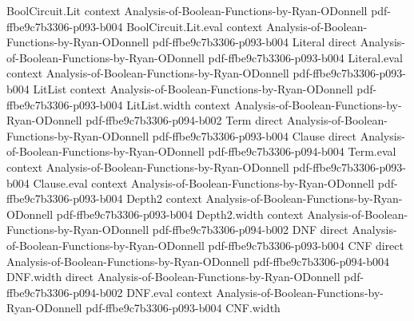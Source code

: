 \begin{theorem}
\leanok
{}
\proofstep
  {BoolCircuit.Lit}
  {context}
  {Analysis-of-Boolean-Functions-by-Ryan-ODonnell}
  {pdf-ffbe9c7b3306-p093-b004}
\proofstep
  {BoolCircuit.Lit.eval}
  {context}
  {Analysis-of-Boolean-Functions-by-Ryan-ODonnell}
  {pdf-ffbe9c7b3306-p093-b004}
\proofstep
  {Literal}
  {direct}
  {Analysis-of-Boolean-Functions-by-Ryan-ODonnell}
  {pdf-ffbe9c7b3306-p093-b004}
\proofstep
  {Literal.eval}
  {context}
  {Analysis-of-Boolean-Functions-by-Ryan-ODonnell}
  {pdf-ffbe9c7b3306-p093-b004}
\proofstep
  {LitList}
  {context}
  {Analysis-of-Boolean-Functions-by-Ryan-ODonnell}
  {pdf-ffbe9c7b3306-p093-b004}
\proofstep
  {LitList.width}
  {context}
  {Analysis-of-Boolean-Functions-by-Ryan-ODonnell}
  {pdf-ffbe9c7b3306-p094-b002}
\proofstep
  {Term}
  {direct}
  {Analysis-of-Boolean-Functions-by-Ryan-ODonnell}
  {pdf-ffbe9c7b3306-p093-b004}
\proofstep
  {Clause}
  {direct}
  {Analysis-of-Boolean-Functions-by-Ryan-ODonnell}
  {pdf-ffbe9c7b3306-p094-b004}
\proofstep
  {Term.eval}
  {context}
  {Analysis-of-Boolean-Functions-by-Ryan-ODonnell}
  {pdf-ffbe9c7b3306-p093-b004}
\proofstep
  {Clause.eval}
  {context}
  {Analysis-of-Boolean-Functions-by-Ryan-ODonnell}
  {pdf-ffbe9c7b3306-p093-b004}
\proofstep
  {Depth2}
  {context}
  {Analysis-of-Boolean-Functions-by-Ryan-ODonnell}
  {pdf-ffbe9c7b3306-p093-b004}
\proofstep
  {Depth2.width}
  {context}
  {Analysis-of-Boolean-Functions-by-Ryan-ODonnell}
  {pdf-ffbe9c7b3306-p094-b002}
\proofstep
  {DNF}
  {direct}
  {Analysis-of-Boolean-Functions-by-Ryan-ODonnell}
  {pdf-ffbe9c7b3306-p093-b004}
\proofstep
  {CNF}
  {direct}
  {Analysis-of-Boolean-Functions-by-Ryan-ODonnell}
  {pdf-ffbe9c7b3306-p094-b004}
\proofstep
  {DNF.width}
  {direct}
  {Analysis-of-Boolean-Functions-by-Ryan-ODonnell}
  {pdf-ffbe9c7b3306-p094-b002}
\proofstep
  {DNF.eval}
  {context}
  {Analysis-of-Boolean-Functions-by-Ryan-ODonnell}
  {pdf-ffbe9c7b3306-p093-b004}
\proofstep
  {CNF.width}

\end{theorem}
